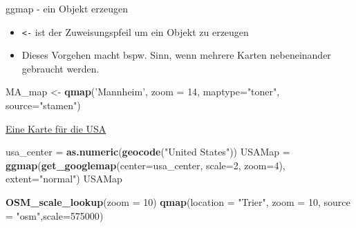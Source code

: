 \documentclass[ignorenonframetext,]{beamer}
\newenvironment{Shaded}{\begin{snugshade}}{\end{snugshade}}
\newcommand{\DataTypeTok}[1]{\textcolor[rgb]{0.13,0.29,0.53}{#1}}
\newcommand{\DecValTok}[1]{\textcolor[rgb]{0.00,0.00,0.81}{#1}}
\newcommand{\KeywordTok}[1]{\textcolor[rgb]{0.13,0.29,0.53}{\textbf{#1}}}
\newcommand{\NormalTok}[1]{#1}
\newcommand{\StringTok}[1]{\textcolor[rgb]{0.31,0.60,0.02}{#1}}
\providecommand{\tightlist}{%
  \setlength{\itemsep}{0pt}\setlength{\parskip}{0pt}}
\begin{document}
\begin{frame}[fragile]{ggmap - ein Objekt erzeugen}
\protect\hypertarget{ggmap---ein-objekt-erzeugen}{}

\begin{itemize}
\tightlist
\item
  \texttt{\textless{}-} ist der Zuweisungspfeil um ein Objekt zu
  erzeugen
\item
  Dieses Vorgehen macht bspw. Sinn, wenn mehrere Karten nebeneinander
  gebraucht werden.
\end{itemize}

\begin{Shaded}
\begin{Highlighting}[]
\NormalTok{MA_map <-}\StringTok{ }\KeywordTok{qmap}\NormalTok{(}\StringTok{'Mannheim'}\NormalTok{, }
               \DataTypeTok{zoom =} \DecValTok{14}\NormalTok{,}
               \DataTypeTok{maptype=}\StringTok{"toner"}\NormalTok{,}
               \DataTypeTok{source=}\StringTok{"stamen"}\NormalTok{)}
\end{Highlighting}
\end{Shaded}

\end{frame}

\begin{frame}[fragile]{\href{https://blog.dominodatalab.com/geographic-visualization-with-rs-ggmaps/}{Eine
Karte für die USA}}
\protect\hypertarget{eine-karte-fur-die-usa}{}

\begin{Shaded}
\begin{Highlighting}[]
\NormalTok{usa_center =}\StringTok{ }\KeywordTok{as.numeric}\NormalTok{(}\KeywordTok{geocode}\NormalTok{(}\StringTok{"United States"}\NormalTok{))}
\NormalTok{USAMap =}\StringTok{ }\KeywordTok{ggmap}\NormalTok{(}\KeywordTok{get_googlemap}\NormalTok{(}\DataTypeTok{center=}\NormalTok{usa_center, }\DataTypeTok{scale=}\DecValTok{2}\NormalTok{, }\DataTypeTok{zoom=}\DecValTok{4}\NormalTok{), }\DataTypeTok{extent=}\StringTok{"normal"}\NormalTok{)}
\NormalTok{USAMap}
\end{Highlighting}
\end{Shaded}

\begin{Shaded}
\begin{Highlighting}[]
\KeywordTok{OSM_scale_lookup}\NormalTok{(}\DataTypeTok{zoom =} \DecValTok{10}\NormalTok{)}
\KeywordTok{qmap}\NormalTok{(}\DataTypeTok{location =} \StringTok{"Trier"}\NormalTok{, }\DataTypeTok{zoom =} \DecValTok{10}\NormalTok{, }\DataTypeTok{source =} \StringTok{"osm"}\NormalTok{,}\DataTypeTok{scale=}\DecValTok{575000}\NormalTok{)}
\end{Highlighting}
\end{Shaded}

\end{frame}
\end{document}
